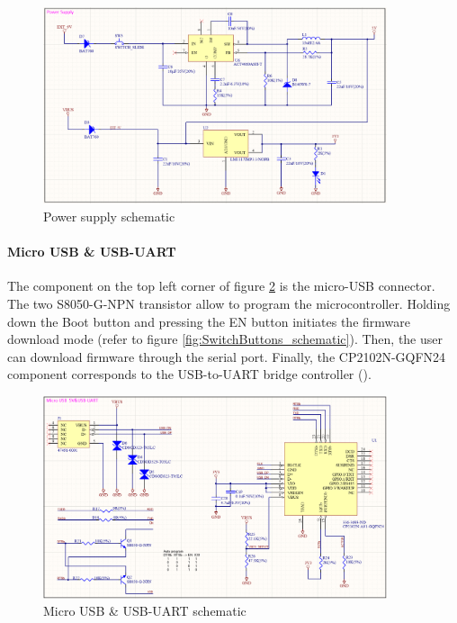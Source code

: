 \begin{figure}[H]
    \centering
    \includegraphics[width=0.9\textwidth]{images/EE_PowerSupply.PNG}
    \caption{Power supply schematic}
    \label{fig:power_supply_schematic}
\end{figure}


\paragraph{Micro USB \& USB-UART} The component on the top left corner of figure \ref{fig:MicroUSB&USB-UART_schematic} is the micro-USB connector. The two S8050-G-NPN transistor allow to program the microcontroller. Holding down the Boot button and pressing the EN button initiates the firmware download mode (refer to figure \ref{fig:SwitchButtons_schematic}). Then, the user can download firmware through the serial port. Finally, the CP2102N-GQFN24 component corresponds to the USB-to-UART bridge controller (\cite{cp2102datasheet}).

\begin{figure}[H]
    \centering
    \includegraphics[width=0.9\textwidth]{images/EE_MicroUSB&USB-UART.PNG}
    \caption{Micro USB \& USB-UART schematic}
    \label{fig:MicroUSB&USB-UART_schematic}
\end{figure}

